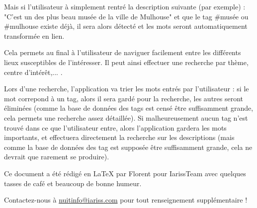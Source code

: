 \documentclass[12pt, a4paper]{article}
\newcommand{\espace}{\vspace{.8cm}}
\newcommand{\authors}{Florent}
\begin{document}
Mais si l'utilisateur à simplement rentré la description suivante (par exemple) : "C'est un des plus beau musée de la ville de Mulhouse" et que le tag #musée ou #mulhouse existe déjà, il sera alors détecté et les mots seront automatiquement transformée en lien.

Cela permets au final à l'utilisateur de naviguer facilement entre les différents lieux susceptibles de l'intéresser. Il peut ainsi effectuer une recherche par thème, centre d'intérêt,... .

Lors d'une recherche, l'application va trier les mots entrés par l'utilisateur :  si le mot correpond à un tag, alors il sera gardé pour la recherche, les autres seront éliminées (comme la base de données des tags est censé être suffisamment grande, cela permets une recherche assez détaillée). Si malheureusement aucun tag n'est trouvé dans ce que l'utilisateur entre, alors l'application gardera les mots importants, et effectuera directement la recherche sur les descriptions (mais comme la base de données des tag est supposée être suffisamment grande, cela ne devrait que rarement se produire).


\espace\vfill{}
Ce document a été rédigé en \LaTeX{} par \authors{} pour IarissTeam avec quelques tasses de café et beaucoup de bonne humeur.

Contactez-nous à \href{mailto:nuitinfo@iariss.com}{nuitinfo@iariss.com} pour tout renseignement supplémentaire !
\end{document}
